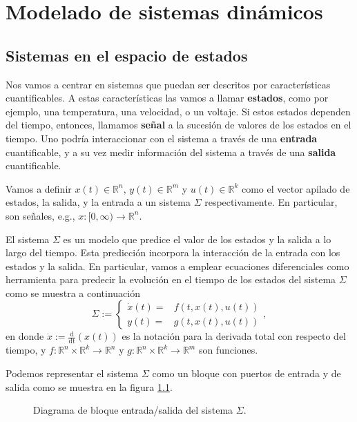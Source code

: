 \chapter{Modelado de sistemas dinámicos}

\section{Sistemas en el espacio de estados}
Nos vamos a centrar en sistemas que puedan ser descritos por características cuantificables. A estas características las vamos a llamar {\bf estados}, como por ejemplo, una temperatura, una velocidad, o un voltaje. Si estos estados dependen del tiempo, entonces, llamamos {\bf señal} a la sucesión de valores de los estados en el tiempo. Uno podría interaccionar con el sistema a través de una {\bf entrada} cuantificable, y a su vez medir información del sistema a través de una {\bf salida} cuantificable.

Vamos a definir $x(t)\in\mathbb{R}^n$, $y(t)\in\mathbb{R}^m$ y $u(t)\in\mathbb{R}^k$ como el vector apilado de estados, la salida, y la entrada a un sistema $\Sigma$ respectivamente. En particular, son señales, e.g., $x :[0,\infty) \to \mathbb{R}^n$.

El sistema $\Sigma$ es un modelo que predice el valor de los estados y la salida a lo largo del tiempo. Esta predicción incorpora la interacción de la entrada con los estados y la salida. En particular, vamos a emplear ecuaciones diferenciales como herramienta para predecir la evolución en el tiempo de los estados del sistema $\Sigma$ como se muestra a continuación
\begin{equation}
	\Sigma := \begin{cases}
		\dot x(t) =& f(t,x(t),u(t)) \\ y(t) =& g(t,x(t),u(t))
	\end{cases}, 
\label{eq: sigma}
\end{equation}
en donde $\dot x := \frac{\mathrm{d}}{\mathrm{dt}}(x(t))$ es la notación para la derivada total con respecto del tiempo, y $f: \mathbb{R}^n \times \mathbb{R}^k \to \mathbb{R}^n$ y $g: \mathbb{R}^n \times \mathbb{R}^k \to \mathbb{R}^m$ son funciones.

Podemos representar el sistema $\Sigma$ como un bloque con puertos de entrada y de salida como se muestra en la figura \ref{fig: sigma}.

\begin{figure}[!h]
\centering
{}
	\caption{Diagrama de bloque entrada/salida del sistema $\Sigma$.}
	\label{fig: sigma}
\end{figure}

